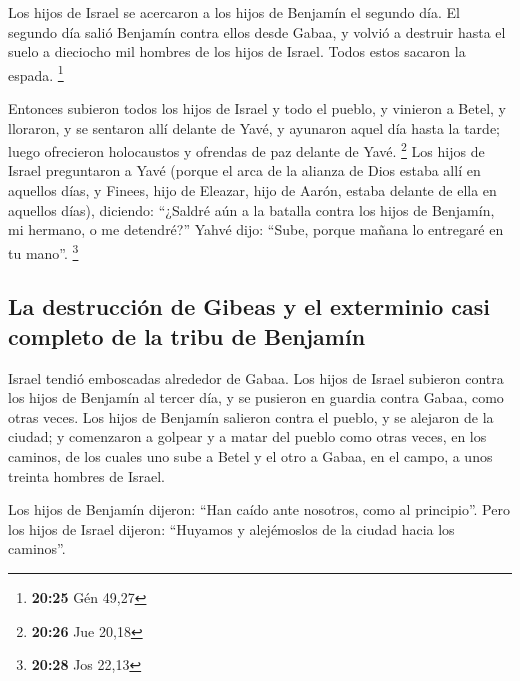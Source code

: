  Los hijos de Israel se acercaron a los hijos de Benjamín
el segundo día.  El segundo día salió Benjamín contra
ellos desde Gabaa, y volvió a destruir hasta el suelo a dieciocho mil
hombres de los hijos de Israel. Todos estos sacaron la espada.
\footnote{\textbf{20:25} Gén 49,27}

 Entonces subieron todos los hijos de Israel y todo el
pueblo, y vinieron a Betel, y lloraron, y se sentaron allí delante de
Yavé, y ayunaron aquel día hasta la tarde; luego ofrecieron holocaustos
y ofrendas de paz delante de Yavé. \footnote{\textbf{20:26} Jue 20,18}
 Los hijos de Israel preguntaron a Yavé (porque el arca
de la alianza de Dios estaba allí en aquellos días,  y
Finees, hijo de Eleazar, hijo de Aarón, estaba delante de ella en
aquellos días), diciendo: ``¿Saldré aún a la batalla contra los hijos de
Benjamín, mi hermano, o me detendré?'' Yahvé dijo: ``Sube, porque mañana
lo entregaré en tu mano''. \footnote{\textbf{20:28} Jos 22,13}

\hypertarget{la-destrucciuxf3n-de-gibeas-y-el-exterminio-casi-completo-de-la-tribu-de-benjamuxedn}{%
\subsection{La destrucción de Gibeas y el exterminio casi completo de la
tribu de
Benjamín}\label{la-destrucciuxf3n-de-gibeas-y-el-exterminio-casi-completo-de-la-tribu-de-benjamuxedn}}

 Israel tendió emboscadas alrededor de Gabaa.
 Los hijos de Israel subieron contra los hijos de
Benjamín al tercer día, y se pusieron en guardia contra Gabaa, como
otras veces.  Los hijos de Benjamín salieron contra el
pueblo, y se alejaron de la ciudad; y comenzaron a golpear y a matar del
pueblo como otras veces, en los caminos, de los cuales uno sube a Betel
y el otro a Gabaa, en el campo, a unos treinta hombres de Israel.

 Los hijos de Benjamín dijeron: ``Han caído ante
nosotros, como al principio''. Pero los hijos de Israel dijeron:
``Huyamos y alejémoslos de la ciudad hacia los caminos''.

